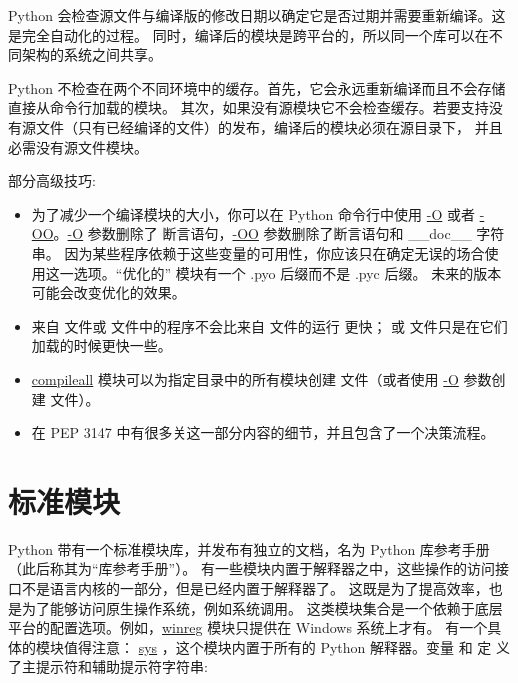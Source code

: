 \documentclass[a4paper,10pt,english]{sphinxmanual}
\begin{document}
Python 会检查源文件与编译版的修改日期以确定它是否过期并需要重新编译。这是完全自动化的过程。
同时，编译后的模块是跨平台的，所以同一个库可以在不同架构的系统之间共享。

Python 不检查在两个不同环境中的缓存。首先，它会永远重新编译而且不会存储直接从命令行加载的模块。
其次，如果没有源模块它不会检查缓存。若要支持没有源文件（只有已经编译的文件）的发布，编译后的模块必须在源目录下，
并且必需没有源文件模块。

部分高级技巧:
\begin{itemize}
\item {} 
为了减少一个编译模块的大小，你可以在 Python 命令行中使用 \href{https://docs.python.org/3/using/cmdline.html\#cmdoption-O}{-O} 或者 \href{https://docs.python.org/3/using/cmdline.html\#cmdoption-OO}{-OO}。\href{https://docs.python.org/3/using/cmdline.html\#cmdoption-O}{-O} 参数删除了
断言语句，\href{https://docs.python.org/3/using/cmdline.html\#cmdoption-OO}{-OO} 参数删除了断言语句和 \_\_doc\_\_ 字符串。
因为某些程序依赖于这些变量的可用性，你应该只在确定无误的场合使用这一选项。“优化的” 模块有一个 .pyo 后缀而不是 .pyc 后缀。
未来的版本可能会改变优化的效果。

\item {} 
来自  文件或  文件中的程序不会比来自  文件的运行
更快； 或  文件只是在它们加载的时候更快一些。

\item {} 
\href{https://docs.python.org/3/library/compileall.html\#module-compileall}{compileall} 模块可以为指定目录中的所有模块创建  文件（或者使用 \href{https://docs.python.org/3/using/cmdline.html\#cmdoption-O}{-O} 参数创建  文件）。

\item {} 
在 PEP 3147 中有很多关这一部分内容的细节，并且包含了一个决策流程。

\end{itemize}


\section{标准模块}
\label{modules:tut-standardmodules}\label{modules:id6}
Python 带有一个标准模块库，并发布有独立的文档，名为 Python 库参考手册（此后称其为“库参考手册”）。
有一些模块内置于解释器之中，这些操作的访问接口不是语言内核的一部分，但是已经内置于解释器了。
这既是为了提高效率，也是为了能够访问原生操作系统，例如系统调用。
这类模块集合是一个依赖于底层平台的配置选项。例如，\href{https://docs.python.org/3/library/winreg.html\#module-winreg}{winreg} 模块只提供在 Windows 系统上才有。
有一个具体的模块值得注意： \href{https://docs.python.org/3/library/sys.html\#module-sys}{sys} ，这个模块内置于所有的 Python 解释器。变量  和  定
义了主提示符和辅助提示符字符串:
\end{document}

